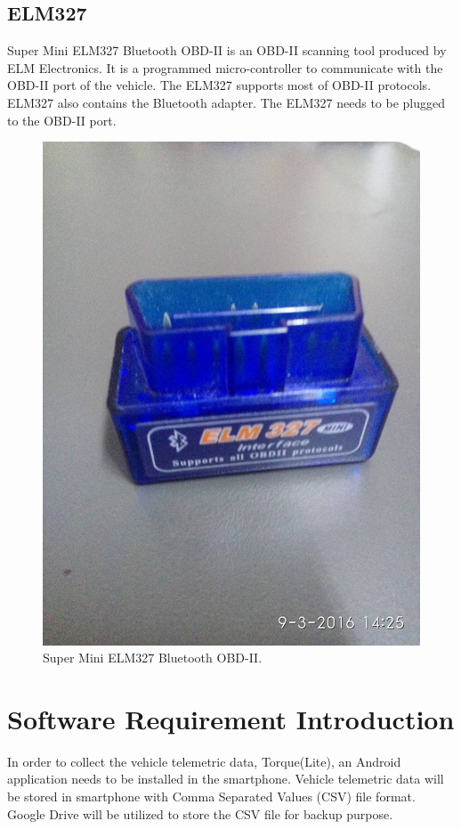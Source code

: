 \subsection{ELM327}
Super Mini ELM327 Bluetooth OBD-II is an OBD-II scanning tool produced by ELM Electronics. It is a programmed micro-controller to communicate with the OBD-II port of the vehicle. The ELM327 supports most of OBD-II protocols. ELM327 also contains the Bluetooth adapter. The ELM327 needs to be plugged to the OBD-II port.

\begin{figure}[hbt!]\centering
\includegraphics[height=.5\textheight]{image/ELM327}
\caption{Super Mini ELM327 Bluetooth OBD-II.}
\end{figure}

\section{Software Requirement Introduction}
In order to collect the vehicle telemetric data, Torque(Lite), an Android application needs to be installed in the smartphone. Vehicle telemetric data will be stored in smartphone with Comma Separated Values (CSV) file format. Google Drive will be utilized to store the CSV file for backup purpose.

